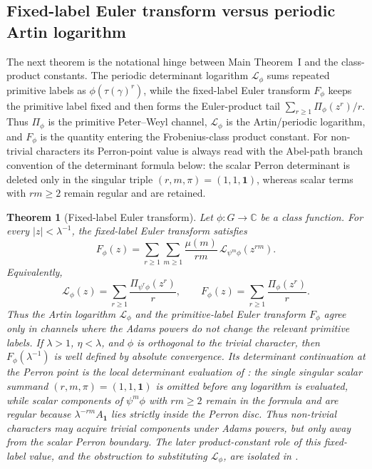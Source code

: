 \documentclass[11pt,a4paper]{amsart}
\theoremstyle{plain}
\newtheorem{theorem}{Theorem}[section]
\theoremstyle{definition}
\theoremstyle{remark}
\newcommand{\CC}{\mathbb{C}}
\begin{document}
\subsection{Fixed-label Euler transform versus periodic Artin logarithm}
\label{subsec:fixed-label-vs-artin-logarithm}

The next theorem is the notational hinge between Main Theorem~I and the
class-product constants.  The periodic determinant logarithm
\(\mathcal L_\phi\) sums repeated primitive labels as
\(\phi(\tau(\gamma)^r)\), while the fixed-label Euler transform
\(F_\phi\) keeps the primitive label fixed and then forms the Euler-product
tail \(\sum_{r\ge1}\Pi_\phi(z^r)/r\).  Thus \(\Pi_\phi\) is the primitive
Peter--Weyl channel, \(\mathcal L_\phi\) is the Artin/periodic logarithm,
and \(F_\phi\) is the quantity entering the Frobenius-class product
constant.  For non-trivial characters its Perron-point value is always read
with the Abel-path branch convention of the determinant formula below: the
scalar Perron determinant is deleted only in the singular triple
\((r,m,\pi)=(1,1,\mathbf1)\), whereas scalar terms with \(rm\ge2\) remain
regular and are retained.

\begin{theorem}[Fixed-label Euler transform]
  \label{thm:fixed-label-euler-transform}
  Let \(\phi:G\to\CC\) be a class function. For every
  \(|z|<\lambda^{-1}\), the fixed-label Euler transform satisfies
  \begin{equation}\label{eq:fixed-label-euler-transform-adams-mobius}
    F_\phi(z)
    =
    \sum_{r\ge1}\sum_{m\ge1}
      \frac{\mu(m)}{rm}\,
      \mathcal L_{\psi^m\phi}(z^{rm}).
  \end{equation}
  Equivalently,
  \begin{equation}\label{eq:fixed-label-euler-transform-vs-artin}
    \mathcal L_\phi(z)
    =
    \sum_{r\ge1}\frac{\Pi_{\psi^r\phi}(z^r)}{r},
    \qquad
    F_\phi(z)
    =
    \sum_{r\ge1}\frac{\Pi_\phi(z^r)}{r}.
  \end{equation}
  Thus the Artin logarithm \(\mathcal L_\phi\) and the primitive-label
  Euler transform \(F_\phi\) agree only in channels where the Adams powers
  do not change the relevant primitive labels. If \(\lambda>1\),
  \(\eta<\lambda\), and \(\phi\) is orthogonal to the trivial character,
  then \(F_\phi(\lambda^{-1})\) is well defined by absolute convergence.
  Its determinant continuation at the Perron point is the local
  determinant evaluation of :
  the single singular scalar summand
  \((r,m,\pi)=(1,1,\mathbf1)\) is omitted before any logarithm is
  evaluated, while scalar components of \(\psi^m\phi\) with \(rm\ge2\)
  remain in the formula and are regular because
  \(\lambda^{-rm}A_{\mathbf1}\) lies strictly inside the Perron disc.
  Thus non-trivial characters may acquire trivial components under Adams
  powers, but only away from the scalar Perron boundary.  The later
  product-constant role of this fixed-label value, and the obstruction to
  substituting \(\mathcal L_\phi\), are isolated in
  .
\end{theorem}
\end{document}
